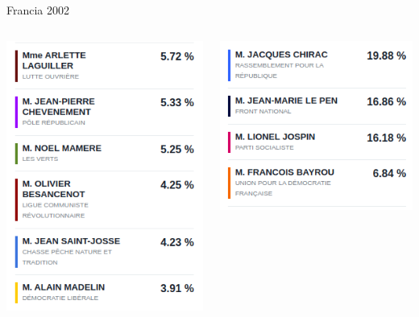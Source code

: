 \documentclass[bigger]{beamer}
\begin{document}
\begin{frame}[label={sec:org158fa54}]{Francia 2002}
\begin{columns}
\begin{column}{0.33\columnwidth}
\includegraphics[width=\textwidth]{./pics/f2.png}
\end{column}
\begin{column}{0.33\columnwidth}
\includegraphics[width=\textwidth]{./pics/f1.png}
\end{column}
\end{columns}


\end{frame}
\end{document}

